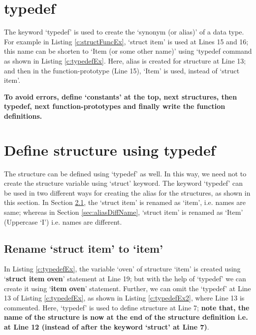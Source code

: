\section{typedef}
The keyword `typedef' is used to create the `synonym (or alias)' of a data type. For example in Listing \ref{c:structFuncEx}, `struct item' is used at Lines 15 and 16; this name can be shorten to `Item (or some other name)' using `typedef command as shown in Listing \ref{c:typedefEx}. Here, alias is created for structure at Line 13; and then in the function-prototype (Line 15), `Item' is used, instead of `struct item'. 

\begin{noNumBox}
\textbf{To avoid errors, define `constants' at the top, next structures, then typedef, next function-prototypes and finally write the function definitions.}
\end{noNumBox}
 



\section{Define structure using typedef}
The structure can be defined using `typedef' as well. In this way, we need not to create the structure variable using `struct' keyword. The keyword `typedef' can be used in two different ways for creating the alias for the structures, as shown in this section. In Section \ref{sec:aliasSameName}, the `struct item' is renamed as `item', i.e. names are same; whereas in Section \ref{sec:aliasDiffName}, `struct item' is renamed as `Item' (Uppercase `I') i.e. names are different. 

\subsection{Rename `struct item' to `item'}  \label{sec:aliasSameName}
	In Listing \ref{c:typedefEx}, the variable `oven' of structure `item' is created using `\textbf{struct item oven}' statement at Line 19; but with the help of `typedef' we can create it using `\textbf{item oven}' statement. Further, we can omit the `typedef' at Line 13 of Listing \ref{c:typedefEx}, as shown in Listing \ref{c:typedefEx2}, where Line 13 is commented. Here, `typedef' is used to define structure at Line 7; \textbf{note that, the name of the structure is now at the end of the structure definition i.e. at Line 12 (instead of after the keyword `struct' at Line 7)}. 
	
